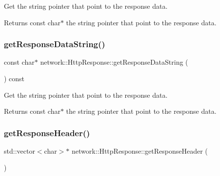 Get the string pointer that point to the response data. \begin{DoxyReturn}{Returns}
const char$\ast$ the string pointer that point to the response data. 
\end{DoxyReturn}
\mbox{\label{classnetwork_1_1HttpResponse_a6526a4a5c1247a20ab171fa246218b85}} 
\subsubsection{\texorpdfstring{get\+Response\+Data\+String()}{getResponseDataString()}\hspace{0.1cm}{\footnotesize\ttfamily [2/2]}}
{\footnotesize\ttfamily const char$\ast$ network\+::\+Http\+Response\+::get\+Response\+Data\+String (\begin{DoxyParamCaption}{ }\end{DoxyParamCaption}) const\hspace{0.3cm}{\ttfamily [inline]}}

Get the string pointer that point to the response data. \begin{DoxyReturn}{Returns}
const char$\ast$ the string pointer that point to the response data. 
\end{DoxyReturn}
\mbox{\label{classnetwork_1_1HttpResponse_a04a9c96a83fb6282cfe1462d0e3345d6}} 
\subsubsection{\texorpdfstring{get\+Response\+Header()}{getResponseHeader()}\hspace{0.1cm}{\footnotesize\ttfamily [1/2]}}
{\footnotesize\ttfamily std\+::vector$<$char$>$$\ast$ network\+::\+Http\+Response\+::get\+Response\+Header (\begin{DoxyParamCaption}{ }\end{DoxyParamCaption})\hspace{0.3cm}{\ttfamily [inline]}}

